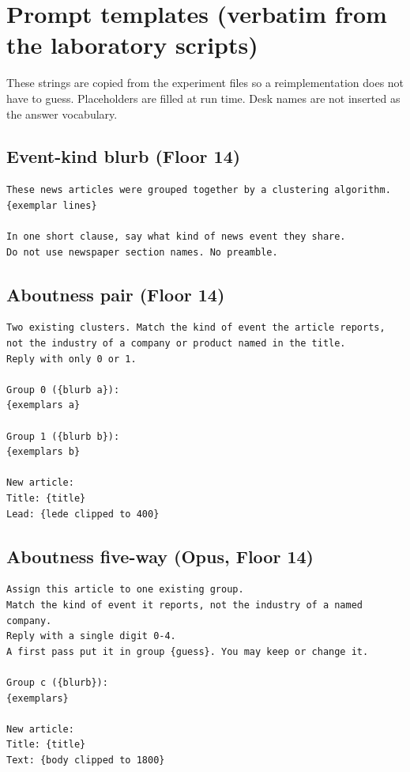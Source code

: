 \documentclass[11pt,a4paper]{article}
\begin{document}
\appendix
\section{Prompt templates (verbatim from the laboratory scripts)}

These strings are copied from the experiment files so a
reimplementation does not have to guess. Placeholders are
filled at run time. Desk names are not inserted as the
answer vocabulary.

\subsection{Event-kind blurb (Floor 14)}

\begin{verbatim}
These news articles were grouped together by a clustering algorithm.
{exemplar lines}

In one short clause, say what kind of news event they share.
Do not use newspaper section names. No preamble.
\end{verbatim}

\subsection{Aboutness pair (Floor 14)}

\begin{verbatim}
Two existing clusters. Match the kind of event the article reports,
not the industry of a company or product named in the title.
Reply with only 0 or 1.

Group 0 ({blurb a}):
{exemplars a}

Group 1 ({blurb b}):
{exemplars b}

New article:
Title: {title}
Lead: {lede clipped to 400}
\end{verbatim}

\subsection{Aboutness five-way (Opus, Floor 14)}

\begin{verbatim}
Assign this article to one existing group.
Match the kind of event it reports, not the industry of a named company.
Reply with a single digit 0-4.
A first pass put it in group {guess}. You may keep or change it.

Group c ({blurb}):
{exemplars}

New article:
Title: {title}
Text: {body clipped to 1800}
\end{verbatim}
\end{document}
